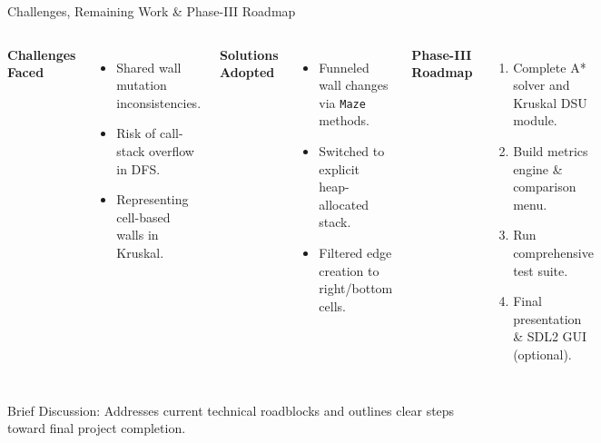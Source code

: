\documentclass[aspectratio=169,11pt]{beamer}
\newcommand{\smallnote}[1]{%
\vspace{0.08cm}
{\scriptsize\color{GEUGrey}#1}
}
\begin{document}
\begin{frame}{Challenges, Remaining Work \& Phase-III Roadmap}

\begin{columns}[T,totalwidth=\textwidth]


\textbf{\color{GEUBlue}Challenges Faced}

\begin{itemize}\itemsep2pt
\item Shared wall mutation inconsistencies.
\item Risk of call-stack overflow in DFS.
\item Representing cell-based walls in Kruskal.
\end{itemize}

\vspace{2mm}

\textbf{\color{GEUBlue}Solutions Adopted}

\begin{itemize}\itemsep2pt
\item Funneled wall changes via \texttt{Maze} methods.
\item Switched to explicit heap-allocated stack.
\item Filtered edge creation to right/bottom cells.
\end{itemize}


\textbf{\color{GEUBlue}Phase-III Roadmap}

\begin{enumerate}\itemsep3pt
\item Complete A* solver and Kruskal DSU module.
\item Build metrics engine \& comparison menu.
\item Run comprehensive test suite.
\item Final presentation \& SDL2 GUI (optional).
\end{enumerate}

\end{columns}

\vfill

\smallnote{
Brief Discussion: Addresses current technical roadblocks and outlines clear steps toward final project completion.
}

\end{frame}
\end{document}
